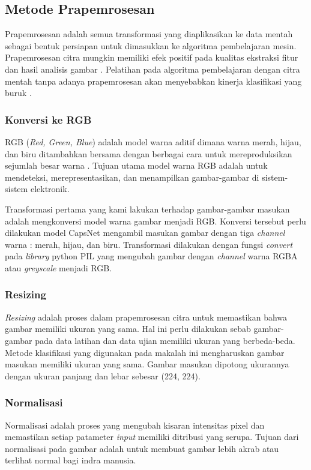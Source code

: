\documentclass{article}
\begin{document}
    \subsection{Metode Prapemrosesan}
    Prapemrosesan adalah semua transformasi yang diaplikasikan ke data mentah sebagai bentuk persiapan untuk dimasukkan ke algoritma pembelajaran mesin. Prapemrosesan citra mungkin memiliki efek positif pada kualitas ekstraksi fitur dan hasil analisis gambar \cite{krig}. Pelatihan pada algoritma pembelajaran dengan citra mentah tanpa adanya prapemrosesan akan menyebabkan kinerja klasifikasi yang buruk \cite{pal}.
    	\subsubsection{Konversi ke RGB}
    	RGB (\textit{Red, Green, Blue}) adalah model warna aditif dimana warna merah, hijau, dan biru ditambahkan bersama dengan berbagai cara untuk mereproduksikan sejumlah besar warna \cite{robert}. Tujuan utama model warna RGB adalah untuk mendeteksi, merepresentasikan, dan menampilkan gambar-gambar di sistem-sistem elektronik.
    	\par
    	Transformasi pertama yang kami lakukan terhadap gambar-gambar masukan adalah mengkonversi model warna gambar menjadi RGB. Konversi tersebut perlu dilakukan model CapsNet mengambil masukan gambar dengan tiga \textit{channel} warna : merah, hijau, dan biru. Transformasi dilakukan dengan fungsi \textit{convert} pada \textit{library} python PIL yang mengubah gambar dengan \textit{channel} warna RGBA atau \textit{greyscale} menjadi RGB.  
    	
    	\subsubsection{Resizing}
    	\textit{Resizing} adalah proses dalam prapemrosesan citra untuk	memastikan bahwa gambar memiliki ukuran yang sama. Hal ini perlu dilakukan sebab gambar-gambar pada data latihan dan data ujian memiliki ukuran yang berbeda-beda. Metode klasifikasi yang digunakan pada makalah ini mengharuskan gambar masukan memiliki ukuran yang sama. Gambar masukan dipotong ukurannya dengan ukuran panjang dan lebar sebesar (224, 224).
		
		\subsubsection{Normalisasi}
		Normalisasi adalah proses yang mengubah kisaran intensitas pixel dan memastikan setiap patameter \textit{input} memiliki ditribusi yang serupa. 
		Tujuan dari normalisasi pada gambar adalah untuk membuat gambar lebih akrab atau terlihat normal bagi indra manusia.\par
		
\end{document}
